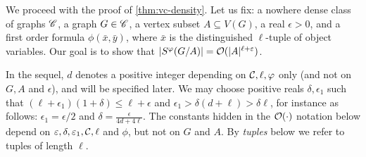 We proceed with the proof of \autoref{thm:vc-density}.
%
 Let us fix: a nowhere dense class of graphs $\CCC$, a graph $G\in \CCC$, a vertex subset $A\subseteq V(G)$, a real $\epsilon>0$, and 
 a first order formula $\phi(\bar x,\bar y)$, where $\bar x$ is the distinguished $\ell$-tuple of object variables.
 Our goal is to show that $|S^\phi(G/A)|=\Oof(|A|^{\ell+\epsilon})$.
 	   
In the sequel, $d$ denotes a positive integer 
depending on ${\cal C},\ell,\phi$ only (and not on $G, A$ and $\epsilon$), and will be specified later. We may choose positive reals
$\delta,\epsilon_1$ such that 
	 $(\ell+\epsilon_1)(1+\delta) 
	 \le
	 \ell+\epsilon$ and $\epsilon_1>\delta(d+\ell)> \delta\ell$, for instance as follows: $\epsilon_1=\epsilon/2$ and $\delta=\frac{\epsilon}{4d+4\ell}$.
The constants hidden in the $\Oof(\cdot)$ notation below depend
 on $\epsilon,\delta,\epsilon_1,\cal C, \ell$ and $\phi$, but not on $G$ and $A$.   By \emph{tuples} below we refer to tuples of length $\ell$.

